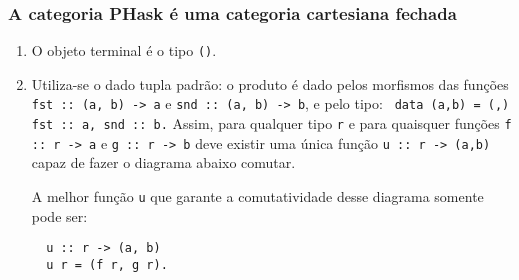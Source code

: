\documentclass{beamer}
\begin{document}
\begin{frame}[fragile]
  \frametitle{A categoria \textbf{PHask} \'e uma categoria cartesiana fechada}

\begin{enumerate}
  \item O objeto terminal \'e o tipo \texttt{()}.
  \item Utiliza-se o dado tupla padr\~ao: o produto \'e dado pelos morfismos das fun\c{c}\~oes \texttt{fst :: (a, b) -> a} e \texttt{snd :: (a, b) -> b}, e  
pelo tipo: \texttt{ data (a,b) = (,) { fst :: a, snd :: b}.}
Assim, para qualquer tipo \texttt{r} e para quaisquer fun\c{c}\~oes \texttt{f :: r -> a} e \texttt{g :: r -> b}
deve existir uma \'unica fun\c{c}\~ao \texttt{u :: r -> (a,b)} capaz de fazer o diagrama abaixo comutar.\\

    \begin{minipage}{.43\textwidth}
\begin{figure}[H]
    \centering
    \label{comuproHaskell}
\end{figure}
    \end{minipage}
    \begin{minipage}{.43\textwidth}
    A melhor fun\c{c}\~ao \texttt{u} que garante a comutatividade desse diagrama somente pode ser:
\begin{verbatim}
  u :: r -> (a, b)
  u r = (f r, g r).
\end{verbatim}
\end{minipage}
\end{enumerate}
\end{frame}
\end{document}
